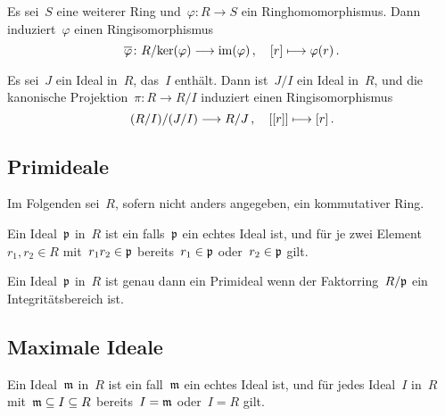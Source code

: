 \begin{corollary}
  Es sei~$S$ eine weiterer Ring und~$\varphi \colon R \to S$ ein Ringhomomorphismus.
  Dann induziert~$\varphi$ einen Ringisomorphismus
  \[
    \induced{\varphi}
    \colon
    R/{\ker(\varphi)} \to \im(\varphi) \,,
    \quad
    \class{r}
    \mapsto
    \varphi(r) \,.
  \]
\end{corollary}


\begin{theorem}
  Es sei~$J$ ein Ideal in~$R$, das~$I$ enthält.
  Dann ist~$J/I$ ein Ideal in~$R$, und die kanonische Projektion~$\pi \colon R \to R/I$ induziert einen Ringisomorphismus
  \[
    (R/I) / (J/I)
    \to
    R/J \,,
    \quad
    \class{ \class{r} }
    \mapsto
    \class{r} \,.
  \]
\end{theorem}



\subsection{Primideale}

\begin{convention}
  Im Folgenden sei~$R$, sofern nicht anders angegeben, ein kommutativer Ring.
\end{convention}

\begin{definition}
  Ein Ideal~$\mathfrak{p}$ in~$R$ ist ein  falls~$\mathfrak{p}$ ein echtes Ideal ist, und für je zwei Element~$r_1, r_2 \in R$ mit~$r_1 r_2 \in \mathfrak{p}$ bereits~$r_1 \in \mathfrak{p}$ oder~$r_2 \in \mathfrak{p}$ gilt.
\end{definition}

\begin{proposition}
  Ein Ideal~$\mathfrak{p}$ in~$R$ ist genau dann ein Primideal wenn der Faktorring~$R/\mathfrak{p}$ ein Integritätsbereich ist.
\end{proposition}



\subsection{Maximale Ideale}

\begin{definition}
  Ein Ideal~$\mathfrak{m}$ in~$R$ ist ein  fall~$\mathfrak{m}$ ein echtes Ideal ist, und für jedes Ideal~$I$ in~$R$ mit~$\mathfrak{m} \subseteq I \subseteq R$ bereits~$I = \mathfrak{m}$ oder~$I = R$ gilt.
\end{definition}

